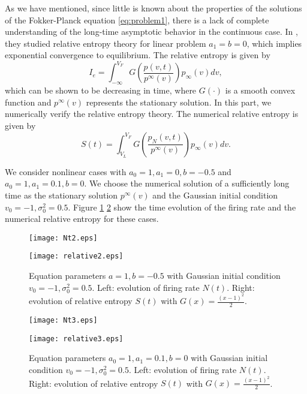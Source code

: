 As we have mentioned, since little is known about the properties of the solutions of the Fokker-Planck equation \eqref{eq:problem1}, there  is a lack of complete understanding of the long-time asymptotic behavior in the continuous case. In \cite{caceres2011analysis}, they studied relative entropy theory for linear problem $a_1=b=0$, which implies exponential convergence to equilibrium. The relative entropy is given by
\begin{equation}
    I_e=\int_{-\infty}^{V_{F}} G\left(\frac{p(v, t)}{p^{\infty}(v)}\right) p_{\infty}(v) d v,
\end{equation}
which can be shown to be decreasing in time, where $G(\cdot)$ is a smooth convex function and $p^{\infty}(v)$ represents the stationary solution. In this part, we numerically verify the relative entropy theory. The numerical relative entropy is given by
\begin{equation}
    S(t)=\int_{V_L}^{V_{F}} G\left(\frac{p_N(v, t)}{p^{\infty}(v)}\right) p_{\infty}(v) d v.
\end{equation}

We consider nonlinear cases with $a_0=1,a_1=0,b=-0.5$ and $a_0=1,a_1=0.1,b=0$. We choose the numerical solution of a sufficiently long time as the stationary solution $p^{\infty}(v)$ and the Gaussian initial condition $v_0=-1, \sigma_0^2=0.5$. Figure \ref{fig:relative_entropy2} \ref{fig:relative_entropy3} show the time evolution of the firing rate and the numerical relative entropy for these cases.
\begin{figure}[!htb]
    \centering
    \begin{minipage}[c]{0.49\textwidth}
        \centering
        \texttt{[image: Nt2.eps]}
    \end{minipage}
    \begin{minipage}[c]{0.49\textwidth}
        \centering
        \texttt{[image: relative2.eps]}
    \end{minipage}
    \caption{Equation parameters $a=1,b=-0.5$ with Gaussian initial condition $v_0=-1, \sigma_0^2=0.5$. Left: evolution of firing rate $N(t)$. Right: evolution of relative entropy $S(t)$ with $G(x)=\frac{(x-1)^2}{2}$.}
     \label{fig:relative_entropy2}
\end{figure}
\begin{figure}[!htb]
    \centering
    \begin{minipage}[c]{0.49\textwidth}
        \centering
        \texttt{[image: Nt3.eps]}
    \end{minipage}
    \begin{minipage}[c]{0.49\textwidth}
        \centering
        \texttt{[image: relative3.eps]}
    \end{minipage}
    \caption{Equation parameters $a_0=1,a_1=0.1,b=0$ with Gaussian initial condition $v_0=-1, \sigma_0^2=0.5$. Left: evolution of firing rate $N(t)$. Right: evolution of relative entropy $S(t)$ with $G(x)=\frac{(x-1)^2}{2}$.}
     \label{fig:relative_entropy3}
\end{figure}


